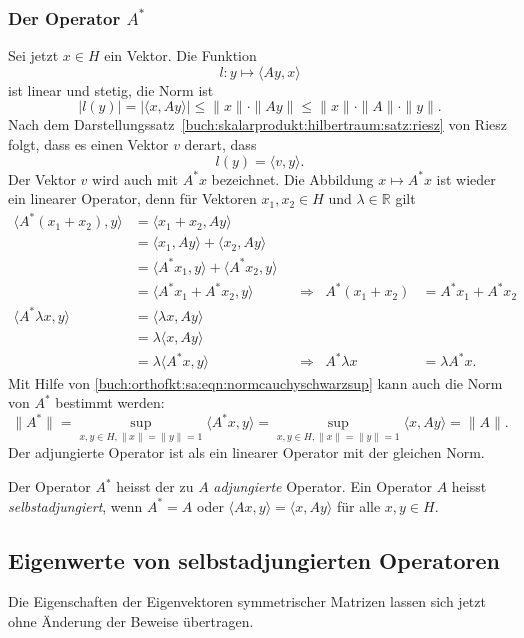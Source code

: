 %
%
\subsubsection{Der Operator $A^*$}
Sei jetzt $x\in H$ ein Vektor.
Die Funktion
\[
l
\colon
y\mapsto \langle Ay,x\rangle
\]
ist linear und stetig, die Norm ist
\[
|l(y)|
=
|\langle x, Ay\rangle|
\le
\|x\|
\cdot
\|Ay\|
\le
\|x\| \cdot \|A\| \cdot \|y\|
.
\]
Nach dem Darstellungssatz~\ref{buch:skalarprodukt:hilbertraum:satz:riesz}
von Riesz folgt, dass es einen Vektor $v$ derart, dass
\[
l(y) = \langle v,y\rangle.
\]
Der Vektor $v$ wird auch mit $A^*x$ bezeichnet.
Die Abbildung $x\mapsto A^*x$ ist wieder ein linearer Operator, denn
für Vektoren $x_1,x_2\in H$ und $\lambda\in\mathbb{R}$ gilt
\begin{align*}
\langle A^*(x_1+x_2),y\rangle
&=
\langle x_1+x_2,Ay\rangle
\\
&=
\langle x_1,Ay\rangle
+
\langle x_2,Ay\rangle
\\
&=
\langle A^*x_1,y\rangle
+
\langle A^*x_2,y\rangle
\\
&=
\langle A^*x_1+A^*x_2,y\rangle
&&\Rightarrow&
A^*(x_1+x_2)&=A^*x_1 + A^*x_2
\\
\langle A^*\lambda x,y\rangle
&=
\langle \lambda x,Ay\rangle
\\
&=
\lambda \langle x,Ay\rangle
\\
&=
\lambda \langle A^*x,y\rangle
&&\Rightarrow&
A^*\lambda x&=\lambda A^*x.
\end{align*}
Mit Hilfe von
\eqref{buch:orthofkt:sa:eqn:normcauchyschwarzsup}
kann auch die Norm von $A^*$ bestimmt werden:
\[
\|A^*\|
=
\sup_{x,y\in H, \|x\|=\|y\|=1} \langle A^*x,y\rangle
=
\sup_{x,y\in H, \|x\|=\|y\|=1} \langle x,Ay\rangle
=
\|A\|.
\]
Der adjungierte Operator ist als ein linearer Operator mit
der gleichen Norm.

\begin{definition}
Der Operator $A^*$ heisst der zu $A$ {\em adjungierte} Operator.
%
%
Ein Operator $A$ heisst {\em selbstadjungiert}, wenn $A^*=A$ oder
%
$\langle Ax,y\rangle = \langle x,Ay\rangle$ für alle $x,y\in H$.
\end{definition}


%
%
\subsection{Eigenwerte von selbstadjungierten Operatoren}
Die Eigenschaften der Eigenvektoren symmetrischer Matrizen lassen
sich jetzt ohne Änderung der Beweise übertragen.


